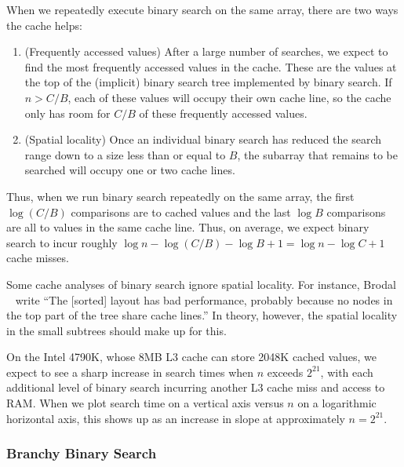 \documentclass{patmorin}
\begin{document}
When we repeatedly execute binary search on the same array, there are
two ways the cache helps:
\begin{enumerate}
  \item (Frequently accessed values) After a large number of searches,
    we expect to find the most frequently accessed values in the cache.
    These are the values at the top of the (implicit) binary search tree
    implemented by binary search.  If $n>C/B$, each of these values will
    occupy their own cache line, so the cache only has room for $C/B$
    of these frequently accessed values.
  \item (Spatial locality) Once an individual binary search has reduced
    the search range down to a size less than or equal to $B$, the
    subarray that remains to be searched will occupy one or two
    cache lines. 
\end{enumerate}


Thus, when we run binary search repeatedly on the same array, the first
$\log(C/B)$ comparisons are to cached values and the last $\log B$
comparisons are all to values in the same cache line.  Thus, on average,
we expect binary search to incur roughly $\log n - \log(C/B) - \log B +
1 = \log n - \log C + 1$ cache misses.

Some cache analyses of binary search ignore spatial locality.
For instance, Brodal \etal\ \cite{brodal.fagerberg.ea:cache} write
``The [sorted] layout has bad performance, probably because no nodes
in the top part of the tree share cache lines.'' In theory, however,
the spatial locality in the small subtrees should make up for this.

On the Intel 4790K, whose 8MB L3 cache can store 2048K cached values, we
expect to see a sharp increase in search times when $n$ exceeds $2^{21}$,
with each additional level of binary search incurring another L3 cache
miss and access to RAM.  When we plot search time on a vertical axis
versus $n$ on a logarithmic horizontal axis, this shows up as an increase
in slope at approximately $n=2^{21}$.

\subsubsection{Branchy Binary Search}
\end{document}
